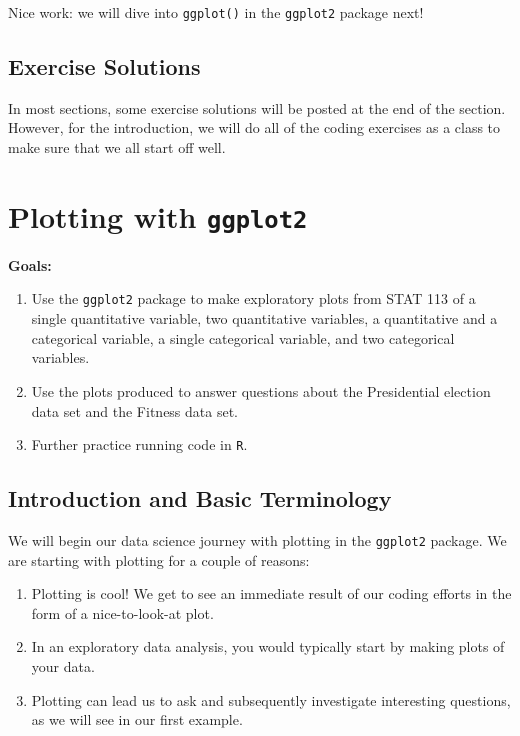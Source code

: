 \documentclass[
]{book}
\begin{document}
Nice work: we will dive into \texttt{ggplot()} in the \texttt{ggplot2} package next!

\hypertarget{solutions-1}{%
\section{Exercise Solutions}\label{solutions-1}}

In most sections, some exercise solutions will be posted at the end of the section. However, for the introduction, we will do all of the coding exercises as a class to make sure that we all start off well.

\hypertarget{ggplot2}{%
\chapter{\texorpdfstring{Plotting with \texttt{ggplot2}}{Plotting with ggplot2}}\label{ggplot2}}

\textbf{Goals:}

\begin{enumerate}
\def\labelenumi{\arabic{enumi}.}
\item
  Use the \texttt{ggplot2} package to make exploratory plots from STAT 113 of a single quantitative variable, two quantitative variables, a quantitative and a categorical variable, a single categorical variable, and two categorical variables.
\item
  Use the plots produced to answer questions about the Presidential election data set and the Fitness data set.
\item
  Further practice running code in \texttt{R}.
\end{enumerate}

\hypertarget{introduction-and-basic-terminology}{%
\section{Introduction and Basic Terminology}\label{introduction-and-basic-terminology}}

We will begin our data science journey with plotting in the \texttt{ggplot2} package. We are starting with plotting for a couple of reasons:

\begin{enumerate}
\def\labelenumi{\arabic{enumi}.}
\item
  Plotting is cool! We get to see an immediate result of our coding efforts in the form of a nice-to-look-at plot.
\item
  In an exploratory data analysis, you would typically start by making plots of your data.
\item
  Plotting can lead us to ask and subsequently investigate interesting questions, as we will see in our first example.
\end{enumerate}
\end{document}
